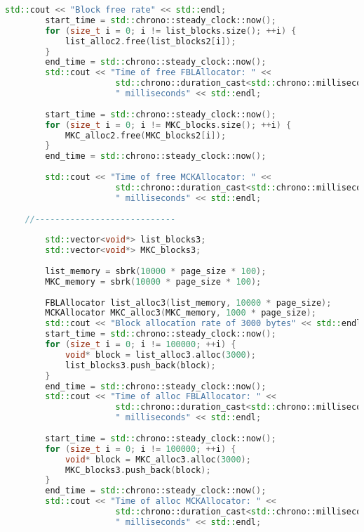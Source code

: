\documentclass[a4paper, 12pt]{article}
\begin{document}
\begin{lstlisting}[language=C++]
        std::cout << "Block free rate" << std::endl;
        start_time = std::chrono::steady_clock::now();
        for (size_t i = 0; i != list_blocks.size(); ++i) {
            list_alloc2.free(list_blocks2[i]);
        }
        end_time = std::chrono::steady_clock::now();
        std::cout << "Time of free FBLAllocator: " << 
                      std::chrono::duration_cast<std::chrono::milliseconds>(end_time - start_time).count() << 
                      " milliseconds" << std::endl;
    
        start_time = std::chrono::steady_clock::now();
        for (size_t i = 0; i != MKC_blocks.size(); ++i) {
            MKC_alloc2.free(MKC_blocks2[i]);
        }
        end_time = std::chrono::steady_clock::now();
    
        std::cout << "Time of free MCKAllocator: " << 
                      std::chrono::duration_cast<std::chrono::milliseconds>(end_time - start_time).count() << 
                      " milliseconds" << std::endl;
    
    //----------------------------
    
        std::vector<void*> list_blocks3;
        std::vector<void*> MKC_blocks3;
    
        list_memory = sbrk(10000 * page_size * 100); 
        MKC_memory = sbrk(10000 * page_size * 100);
    
        FBLAllocator list_alloc3(list_memory, 10000 * page_size);
        MCKAllocator MKC_alloc3(MKC_memory, 1000 * page_size);
        std::cout << "Block allocation rate of 3000 bytes" << std::endl;
        start_time = std::chrono::steady_clock::now();
        for (size_t i = 0; i != 100000; ++i) {
            void* block = list_alloc3.alloc(3000);
            list_blocks3.push_back(block);
        }
        end_time = std::chrono::steady_clock::now();
        std::cout << "Time of alloc FBLAllocator: " << 
                      std::chrono::duration_cast<std::chrono::milliseconds>(end_time - start_time).count() << 
                      " milliseconds" << std::endl;
    
        start_time = std::chrono::steady_clock::now();
        for (size_t i = 0; i != 100000; ++i) {
            void* block = MKC_alloc3.alloc(3000);
            MKC_blocks3.push_back(block);
        }
        end_time = std::chrono::steady_clock::now();
        std::cout << "Time of alloc MCKAllocator: " << 
                      std::chrono::duration_cast<std::chrono::milliseconds>(end_time - start_time).count() << 
                      " milliseconds" << std::endl;
    

\end{lstlisting}
\end{document}
